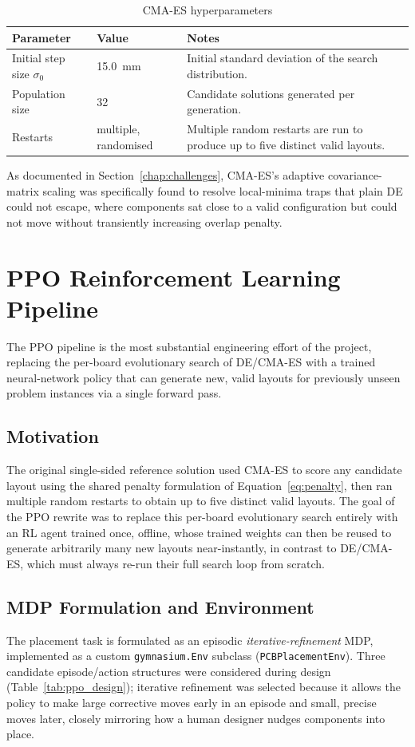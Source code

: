 \documentclass[11pt,a4paper,oneside]{report}
\begin{document}
\begin{table}[H]
\centering
\caption{CMA-ES hyperparameters}
\label{tab:cma_params}
\begin{tabular}{|p{4.5cm}|p{2.5cm}|p{5.7cm}|}
\hline
\textbf{Parameter} & \textbf{Value} & \textbf{Notes} \\
\hline
Initial step size $\sigma_0$ & 15.0~mm & Initial standard deviation of the search distribution. \\ \hline
Population size & 32 & Candidate solutions generated per generation. \\ \hline
Restarts & multiple, randomised & Multiple random restarts are run to produce up to five distinct valid layouts. \\
\hline
\end{tabular}
\end{table}

As documented in Section~\ref{chap:challenges}, CMA-ES's adaptive covariance-matrix scaling was specifically found to resolve local-minima traps that plain DE could not escape, where components sat close to a valid configuration but could not move without transiently increasing overlap penalty.

\section{PPO Reinforcement Learning Pipeline}
\label{sec:ppo_pipeline}
The PPO pipeline is the most substantial engineering effort of the project, replacing the per-board evolutionary search of DE/CMA-ES with a trained neural-network policy that can generate new, valid layouts for previously unseen problem instances via a single forward pass.

\subsection{Motivation}
The original single-sided reference solution used CMA-ES to score any candidate layout using the shared penalty formulation of Equation~\ref{eq:penalty}, then ran multiple random restarts to obtain up to five distinct valid layouts. The goal of the PPO rewrite was to replace this per-board evolutionary search entirely with an RL agent trained once, offline, whose trained weights can then be reused to generate arbitrarily many new layouts near-instantly, in contrast to DE/CMA-ES, which must always re-run their full search loop from scratch.

\subsection{MDP Formulation and Environment}
The placement task is formulated as an episodic \emph{iterative-refinement} MDP, implemented as a custom \texttt{gymnasium.Env} subclass (\texttt{PCBPlacementEnv}). Three candidate episode/action structures were considered during design (Table~\ref{tab:ppo_design}); iterative refinement was selected because it allows the policy to make large corrective moves early in an episode and small, precise moves later, closely mirroring how a human designer nudges components into place.
\end{document}

